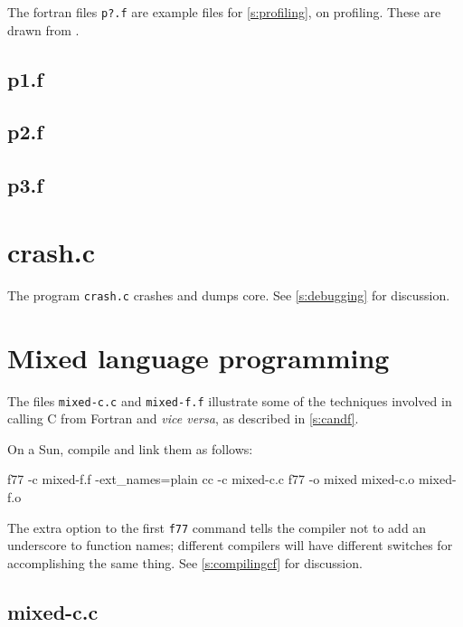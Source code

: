 \documentclass[11pt,oneside,chapters]{starlink}
\begin{document}
The fortran files \texttt{p?.f} are example files for
\ref{s:profiling}, on profiling.  These are drawn
from \citet{sunf77}.

\subsection{p1.f}



\subsection{p2.f}



\subsection{p3.f}



\section{crash.c}
\label{a:crash:c}

The program \texttt{crash.c} crashes and dumps core.
See \ref{s:debugging} for discussion.



\section{Mixed language programming}
\label{a:mixed}

The files \texttt{mixed-c.c} and \texttt{mixed-f.f}
illustrate some of
the techniques involved in calling C from Fortran and
\emph{vice versa}, as described in \ref{s:candf}.

On a Sun, compile and link them as follows:

\begin{terminalv}
f77 -c mixed-f.f -ext_names=plain
cc -c mixed-c.c
f77 -o mixed mixed-c.o mixed-f.o
\end{terminalv}

The extra option to the first \texttt{f77} command
tells the compiler not to add an underscore to function
names; different compilers will have different switches
for accomplishing the same thing.  See \ref{s:compilingcf} for discussion.

\subsection{mixed-c.c}
\end{document}
